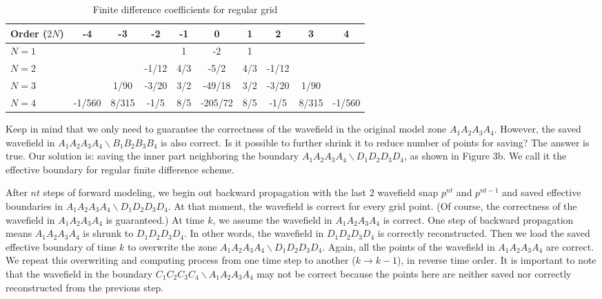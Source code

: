 \begin{table*}
  \centering
  \caption{Finite difference coefficients for regular grid}\label{table:1}
  \begin{tabular}{l|c|c|c|c|c|c|c|c|c}
     \hline
     Order ($2N$)  &-4 	& -3 	& -2 	& -1 	& 0 	& 1 	& 2 	& 3 	& 4\\
     \hline
     $N=1$	     & 	     & 	&  	& 1 	& -2 	& 1 	&  	&   	&  \\
     $N=2$	     &  	    & 	&-1/12	&4/3	&-5/2	&4/3	&-1/12	&   	&  \\
     $N=3$	     & 	     & 1/90	&-3/20	&3/2	&-49/18	&3/2	&-3/20	&1/90	&  \\
     $N=4$	     &-1/560 &8/315	&-1/5	&8/5	&-205/72&8/5	&-1/5	&8/315	&-1/560 \\
     \hline
   \end{tabular}
\end{table*}

Keep in mind that we only need to guarantee the correctness of the wavefield in the original model zone $A_1A_2A_3A_4$. However, the saved wavefield in $A_1A_2A_3A_4\backslash B_1B_2B_3B_4$ is also correct. Is it possible to further shrink it to reduce number of points for saving? The answer is true. Our solution is: saving the inner part neighboring the boundary $A_1A_2A_3A_4\backslash D_1D_2D_3D_4$, as shown in Figure 3b. We call it the effective boundary for regular finite difference scheme.

After $nt$ steps of forward modeling, we begin out backward propagation with the last 2 wavefield snap $p^{nt}$ and $p^{nt-1}$ and saved effective boundaries in $A_1A_2A_3A_4\backslash D_1D_2D_3D_4$. At that moment, the wavefield is correct for every grid point. (Of course, the correctness of the wavefield in $A_1A_2A_3A_4$ is guaranteed.) At time $k$, we assume the wavefield in $A_1A_2A_3A_4$ is correct. One step of backward propagation means $A_1A_2A_3A_4$ is shrunk to $D_1D_2D_3D_4$. In other words, the wavefield in $D_1D_2D_3D_4$ is correctly reconstructed. Then we load the saved effective boundary of time $k$ to overwrite the zone $A_1A_2A_3A_4\backslash D_1D_2D_3D_4$. Again, all the points of the wavefield in $A_1A_2A_3A_4$ are correct. We repeat this overwriting and computing process from one time step to another ($k\rightarrow k-1$), in reverse time order. It is important to note that the wavefield in the boundary $C_1C_2C_3C_4\backslash A_1A_2A_3A_4$ may not be correct because the points here are neither saved nor correctly reconstructed from the previous step.

